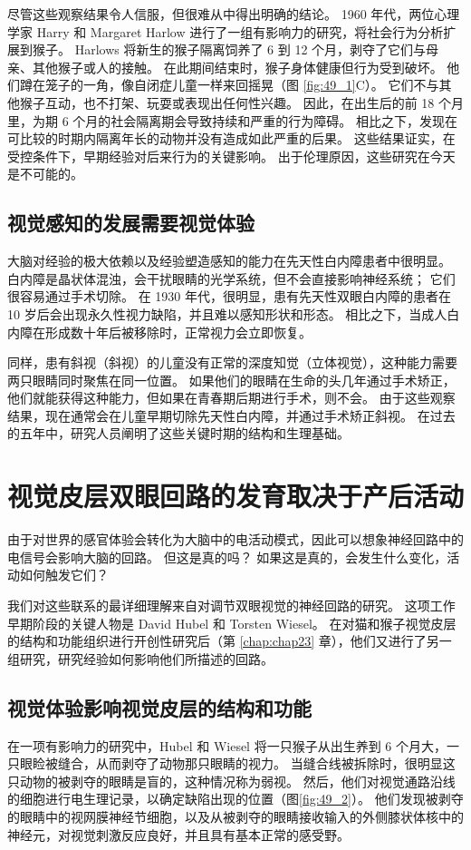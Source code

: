 尽管这些观察结果令人信服，但很难从中得出明确的结论。
1960 年代，两位心理学家 Harry 和 Margaret Harlow 进行了一组有影响力的研究，将社会行为分析扩展到猴子。
Harlows 将新生的猴子隔离饲养了 6 到 12 个月，剥夺了它们与母亲、其他猴子或人的接触。
在此期间结束时，猴子身体健康但行为受到破坏。 他们蹲在笼子的一角，像自闭症儿童一样来回摇晃（图 \ref{fig:49_1}C）。 它们不与其他猴子互动，也不打架、玩耍或表现出任何性兴趣。 因此，在出生后的前 18 个月里，为期 6 个月的社会隔离期会导致持续和严重的行为障碍。 相比之下，发现在可比较的时期内隔离年长的动物并没有造成如此严重的后果。 这些结果证实，在受控条件下，早期经验对后来行为的关键影响。 出于伦理原因，这些研究在今天是不可能的。

\subsection{视觉感知的发展需要视觉体验}

大脑对经验的极大依赖以及经验塑造感知的能力在先天性白内障患者中很明显。 白内障是晶状体混浊，会干扰眼睛的光学系统，但不会直接影响神经系统； 它们很容易通过手术切除。 在 1930 年代，很明显，患有先天性双眼白内障的患者在 10 岁后会出现永久性视力缺陷，并且难以感知形状和形态。 相比之下，当成人白内障在形成数十年后被移除时，正常视力会立即恢复。

同样，患有斜视（斜视）的儿童没有正常的深度知觉（立体视觉），这种能力需要两只眼睛同时聚焦在同一位置。 如果他们的眼睛在生命的头几年通过手术矫正，他们就能获得这种能力，但如果在青春期后期进行手术，则不会。 由于这些观察结果，现在通常会在儿童早期切除先天性白内障，并通过手术矫正斜视。 在过去的五年中，研究人员阐明了这些关键时期的结构和生理基础。

\section{视觉皮层双眼回路的发育取决于产后活动}
由于对世界的感官体验会转化为大脑中的电活动模式，因此可以想象神经回路中的电信号会影响大脑的回路。 但这是真的吗？ 如果这是真的，会发生什么变化，活动如何触发它们？

我们对这些联系的最详细理解来自对调节双眼视觉的神经回路的研究。 这项工作早期阶段的关键人物是 David Hubel 和 Torsten Wiesel。 在对猫和猴子视觉皮层的结构和功能组织进行开创性研究后（第 \ref{chap:chap23} 章），他们又进行了另一组研究，研究经验如何影响他们所描述的回路。

\subsection{视觉体验影响视觉皮层的结构和功能}
在一项有影响力的研究中，Hubel 和 Wiesel 将一只猴子从出生养到 6 个月大，一只眼睑被缝合，从而剥夺了动物那只眼睛的视力。 当缝合线被拆除时，很明显这只动物的被剥夺的眼睛是盲的，这种情况称为弱视。 
然后，他们对视觉通路沿线的细胞进行电生理记录，以确定缺陷出现的位置（图\ref{fig:49_2}）。 
他们发现被剥夺的眼睛中的视网膜神经节细胞，以及从被剥夺的眼睛接收输入的外侧膝状体核中的神经元，对视觉刺激反应良好，并且具有基本正常的感受野。


